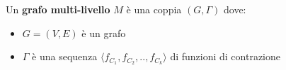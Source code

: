 \begin{minipage}[t]{\textwidth}
\begin{definizione}
    Un \textbf{grafo multi-livello} $M$ \`e una coppia $(G, \Gamma)$ dove:
        \begin{itemize}
            \item $G = (V, E)$ \`e un grafo
            \item $\Gamma$ \`e una sequenza $\langle f_{C_1}, f_{C_2}, .., f_{C_k} \rangle$ di funzioni di contrazione
        \end{itemize}
    \end{definizione}
\end{minipage}